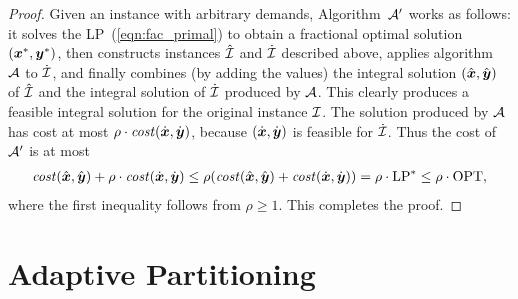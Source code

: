 \documentclass[11pt]{article}
\begin{document}

\begin{proof}
  Given an {\FTFP} instance with arbitrary demands, Algorithm~${\cal A}'$ works
as follows: it solves the LP~(\ref{eqn:fac_primal}) to obtain a
  fractional optimal solution $(\boldsymbol{x}^\ast,\boldsymbol{y}^\ast)$, then constructs
  instances ${\hat{\cal I}}$ and ${\dot{\cal I}}$ described above,  applies
  algorithm~${\cal A}$ to ${\dot{\cal I}}$, and finally combines (by adding
  the values) the integral solution $(\hat{\boldsymbol{x}}, \hat{\boldsymbol{y}})$ of
  ${\hat{\cal I}}$ and the integral solution of ${\dot{\cal I}}$ produced
  by ${\cal A}$. This clearly produces a feasible integral
  solution for the original instance $\mathcal{I}$.
The solution produced by ${\cal A}$ has cost at most
$\rho\cdot{\it cost}(\dot{\boldsymbol{x}},\dot{\boldsymbol{y}})$, because $(\dot{\boldsymbol{x}},\dot{\boldsymbol{y}})$
is feasible for ${\dot{\cal I}}$. Thus the cost of ${\cal A}'$ is at most
% 
 \begin{align*}
 {\it cost}(\hat{\boldsymbol{x}}, \hat{\boldsymbol{y}}) + \rho\cdot{\it cost}(\dot{\boldsymbol{x}},\dot{\boldsymbol{y}})
	\le
 \rho({\it cost}(\hat{\boldsymbol{x}}, \hat{\boldsymbol{y}}) + {\it cost}(\dot{\boldsymbol{x}},\dot{\boldsymbol{y}}))
		= \rho\cdot\mbox{\rm LP}^\ast \le \rho\cdot\mbox{\rm OPT},
  \end{align*}
%
where the first inequality follows from $\rho\geq 1$. This completes
the proof.
\end{proof}


\section{Adaptive Partitioning}
\label{sec: adaptive partitioning}
\end{document}
